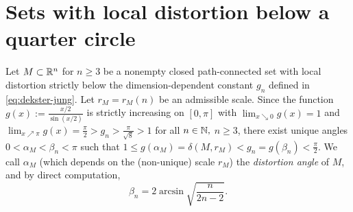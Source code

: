 \section{Sets with local distortion below a quarter circle}\label{sec:distortion}
Let $M\subset\mathbb{R}^n$ for $n\ge 3$ 
be a nonempty closed path-connected set 
with local
distortion strictly below the dimension-dependent 
constant $g_n$ defined in
\eqref{eq:dekster-jung}.
Let $r_M=r_M(n)$ be an admissible scale.
Since the function $g(x):=\frac{x/2}{\sin(x/2)}
$ is strictly increasing on $[0,\pi]$ with 
$\lim_{x\searrow 0}g(x)=1$ and
$\lim_{x\nearrow \pi}g(x)=\frac{\pi}2>g_n>
\frac{\pi}{\sqrt{8}}>1$ for all $n\in\mathbb{N},$
$n\ge 3$, there exist unique angles $0<\alpha_M<\beta_n<\pi $ such that
$1\le g(\alpha_M)=\delta(M,r_M)<g_n=g(\beta_n)<\frac{\pi}2$. 
We call $\alpha_M$
(which depends on the (non-unique) scale $r_M$)
the \emph{distortion angle}
of $M$, and by direct computation, 
\begin{equation}\label{eq:beta_n}
\beta_n=2\arcsin\sqrt{\frac{n}{2n-2}}.
\end{equation}


